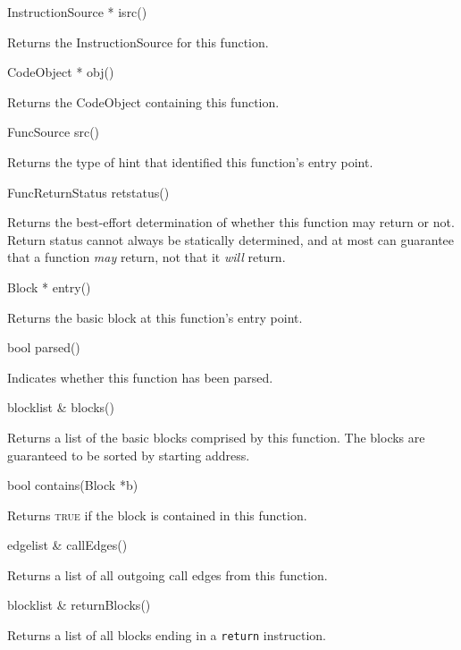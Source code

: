 \documentclass{article}
\newenvironment{apient}{\small\verbatim}{\endverbatim}
\newcommand{\apidesc}[1]{%
{\addtolength{\leftskip}{4em}%
#1\par\medskip}
}
\begin{document}
\begin{apient}
InstructionSource * isrc()
\end{apient}
\apidesc{Returns the InstructionSource for this function.}

\begin{apient}
CodeObject * obj()
\end{apient}
\apidesc{Returns the CodeObject containing this function.}

\begin{apient}
FuncSource src()
\end{apient}
\apidesc{Returns the type of hint that identified this function's entry point.}

\begin{apient}
FuncReturnStatus retstatus()
\end{apient}
\apidesc{Returns the best-effort determination of whether this function may return or not. Return status cannot always be statically determined, and at most can guarantee that a function \emph{may} return, not that it \emph{will} return.}

\begin{apient}
Block * entry()
\end{apient}
\apidesc{Returns the basic block at this function's entry point.}

\begin{apient}
bool parsed()
\end{apient}
\apidesc{Indicates whether this function has been parsed.}

\begin{apient}
blocklist & blocks()
\end{apient}
\apidesc{Returns a list of the basic blocks comprised by this function. The blocks are guaranteed to be sorted by starting address.}

\begin{apient}
bool contains(Block *b)
\end{apient}
\apidesc{Returns {\scshape true} if the block is contained in this function.}

\begin{apient}
edgelist & callEdges()
\end{apient}
\apidesc{Returns a list of all outgoing call edges from this function.}

\begin{apient}
blocklist & returnBlocks()
\end{apient}
\apidesc{Returns a list of all blocks ending in a \texttt{return} instruction.}
\end{document}
